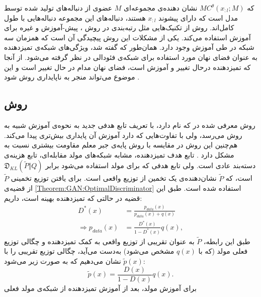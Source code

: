  که
 $MC^{\theta}(x_{:l}; M)$
 نشان دهنده‌ی مجموعه‌ای $M$ عضوی از دنباله‌های تولید شده توسط مدل است که دارای پیشوند
 $x_{:l}$
 هستند، دنباله‌های این مجموعه دنباله‌هایی با طول کامل‌اند. 
\newline
روش
از تکنیک‌هایی مثل رتبه‌بندی در روش
،
پیش-آموزش و غیره برای آموزش استفاده می‌کند. یکی از مشکلات این روش پیچیدگی آن است که همزمان سه شبکه در طی آموزش وجود دارد.
همان‌طور که گفته شد، ویژگی‌های شبکه‌ی تمیزدهنده به عنوان فضای نهان  مورد استفاده برای شبکه‌ی فئودالی در نظر گرفته می‌شود. از آنجا که تمیزدهنده درحال تغییر و آموزش است، فضای نهان مدام در حال تغییر است و این موضوع می‌تواند منجر به ناپایداری روش شود
\cite{Guo2018}.

\subsection{ روش }\label{Method:MaliGAN}
روش معرفی شده در 
\cite{Che2017}
که
نام دارد، با تعریف تابع هدفی جدید به نحوه‌ی آموزش شبیه به روش
می‌رسد،‌ ولی با تفاوت‌هایی که دارد آموزش آن پایداری بیش‌تری پیدا می‌کند. هم‌چنین این روش در مقایسه با روش پایه‌ی جبر معلم مقاومت بیشتری نسبت به مشکل
دارد
\cite{Che2017}.
\newline
تابع هدف تمیزدهنده، مشابه شبکه‌های مولد مقابله‌ای، تابع هزینه‌ی دسته‌بند عادی است. ولی تابع هدفی که برای مولد استفاده می‌شود برابر
$\mathfrak{D}_{KL}(\tilde{P} \Vert Q)$
است، که $\tilde{P}$ نشان‌دهنده‌ی یک تخمین از توزیع واقعی است.
\newline
برای یافتن توزیع تخمینی 
 $\tilde{P}$
از قضیه‌ی 
\ref{Theorem:GAN:OptimalDiscriminator}
استفاده شده است. طبق این قضیه در حالتی که تمیزدهنده بهینه است، داریم:
\begin{equation}
\begin{split}
D^*(x) &= \frac{p_{data}(x)}{p_{data}(x)+q(x)}\\
\Rightarrow p_{data}(x) &= \frac{D^*(x)}{1-D^*(x)}q(x),
\end{split}
\end{equation}
طبق این رابطه، 
$\tilde{P}$
به عنوان تقریبی از توزیع واقعی  به کمک تمیزدهنده و  چگالی توزیع فعلی مولد (که با
$q(x)$
مشخص می‌شود) به‌دست می‌آید، چگالی توزیع تقریبی را با
$\tilde{p}(x)$
نشان می‌دهیم  که به صورت زیر می‌شود:
\begin{equation}\label{Ch2:Equation:MaliGAN:PdataApprox}
\tilde{p}(x) = \frac{D(x)}{1-D(x)}q(x).
\end{equation}
برای آموزش مولد، بعد از آموزش تمیزدهنده از شبکه‌ی مولد فعلی

